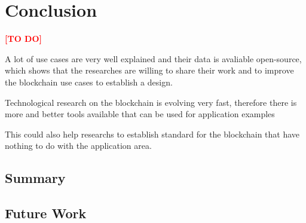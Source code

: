 

\section{Conclusion}
\label{sec:Conclusion}
\textcolor{red}{\textbf{[TO DO]}}

A lot of use cases are very well explained and their data is avaliable open-source, which shows that the researches are willing to share their work and to improve the blockchain use cases to establish a design.

Technological research on the blockchain is evolving very fast, therefore there is more and better tools available that can be used for application examples

This could also help researchs to establish standard for the blockchain that have nothing to do with the application area.

\subsection{Summary}
\label{subsec:Summary}


\subsection{Future Work}
\label{subsec:FutureWork}